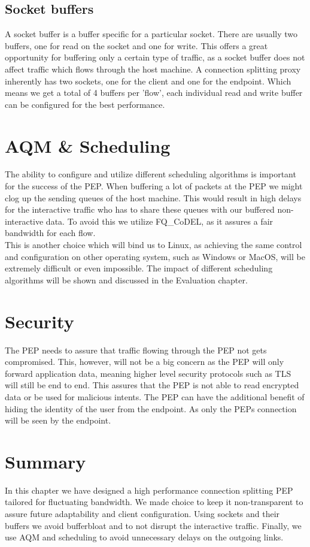 \documentclass[a4paper,english, 11pt]{report}
\begin{document}
\subsection{Socket buffers}
A socket buffer is a buffer specific for a particular socket. There are usually two buffers, one for read on the socket and one for write. This offers a great opportunity for buffering only a certain type of traffic, as a socket buffer does not affect traffic which flows through the host machine. A connection splitting proxy inherently has two sockets, one for the client and one for the endpoint. Which means we get a total of 4 buffers per 'flow', each individual read and write buffer can be configured for the best performance.

\section{AQM \& Scheduling}
The ability to configure and utilize different scheduling algorithms is important for the success of the  PEP. When buffering a lot of packets at the PEP we might clog up the sending queues of the host machine. This would result in high delays for the interactive traffic who has to share these queues with our buffered non-interactive data. To avoid this we utilize FQ\_CoDEL, as it assures a fair bandwidth for each flow.\\

This is another choice which will bind us to Linux, as achieving the same control and configuration on other operating system, such as Windows or MacOS, will be extremely difficult or even impossible. The impact of different scheduling algorithms will be shown and discussed in the Evaluation chapter.

\section{Security}
The PEP needs to assure that traffic flowing through the PEP not gets compromised. This, however, will not be a big concern as the PEP will only forward application data, meaning higher level security protocols such as TLS will still be end to end. This assures that the PEP is not able to read encrypted data or be used for malicious intents. The PEP can have the additional benefit of hiding the identity of the user from the endpoint. As only the PEPs connection will be seen by the endpoint.

\section{Summary}
In this chapter we have designed a high performance connection splitting PEP tailored for fluctuating bandwidth. We made choice to keep it non-transparent to assure future adaptability and client configuration. Using sockets and their buffers we avoid bufferbloat and to not disrupt the interactive traffic. Finally, we use AQM and scheduling to avoid unnecessary delays on the outgoing links.\\
\end{document}
